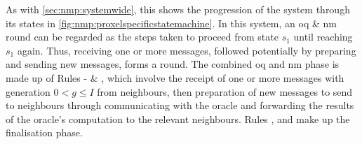 As with \cref{sec:nmp:systemwide}, this  shows the progression of the system through its states in \cref{fig:nmp:proxelspecificstatemachine}.  In this system, an \gls{oq} \& \gls{nm} round can be regarded as the steps taken to proceed from state \(s_1\) until reaching \(s_1\) again.  Thus, receiving one or more messages, followed potentially by preparing and sending new messages, forms a round.  The combined \gls{oq} and \gls{nm} phase is made up of Rules - \& , which involve the receipt of one or more messages with generation \(0 < g \leq I\) from neighbours, then preparation of new messages to send to neighbours through communicating with the oracle and forwarding the results of the oracle's computation to the relevant neighbours.  Rules ,  and  make up the finalisation phase.

